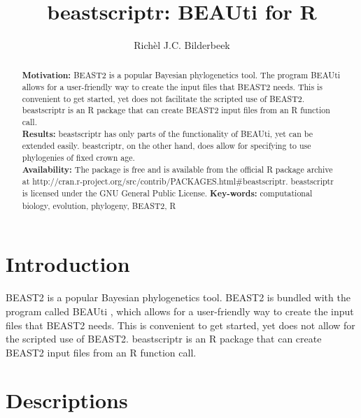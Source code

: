\documentclass{article}
\title{beastscriptr: BEAUti for R}
\author{Rich\`el J.C. Bilderbeek}
\begin{document}
\maketitle


\begin{abstract}
  \textbf{Motivation:} BEAST2 is a popular Bayesian phylogenetics tool.
  The program BEAUti allows for a user-friendly way to create the
  input files that BEAST2 needs. This is convenient to get started, yet
  does not facilitate the scripted use of BEAST2. 
  beastscriptr is an R package that can create BEAST2 input files from an R
  function call.\\
  \textbf{Results:} beastscriptr has only parts of the functionality of BEAUti, yet
  can be extended easily. beastcriptr, on the other hand, does allow for specifying
  to use phylogenies of fixed crown age.\\
  \textbf{Availability:} The package is free and is available from the official R package archive at 
  http://cran.r-project.org/src/contrib/PACKAGES.html\#beastscriptr. 
  beastscriptr is licensed under the GNU General Public License.
  \textbf{Key-words:} computational biology, evolution, phylogeny, BEAST2, R
\end{abstract}

\section{Introduction}

BEAST2 \cite{bouckaert2014beast} is a popular Bayesian phylogenetics tool.
BEAST2 is bundled with the program called BEAUti \cite{drummond2012bayesian},
which  allows for a user-friendly way to create the
input files that BEAST2 needs. This is convenient to get started, yet
does not allow for the scripted use of BEAST2. beastscriptr is an R package 
that can create BEAST2 input files from an R function call.

\section{Descriptions}

\end{document}
